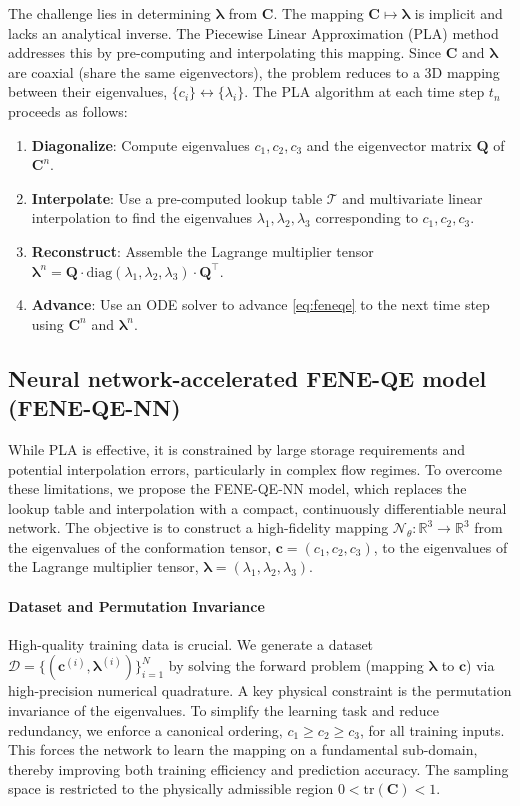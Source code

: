 \documentclass[preprint,12pt]{elsarticle}
\begin{document}
The challenge lies in determining $\bm{\lambda}$ from $\bm{C}$. The mapping $\bm{C} \mapsto \bm{\lambda}$ is implicit and lacks an analytical inverse. The Piecewise Linear Approximation (PLA) method \cite{Wang08} addresses this by pre-computing and interpolating this mapping. Since $\bm{C}$ and $\bm{\lambda}$ are coaxial (share the same eigenvectors), the problem reduces to a 3D mapping between their eigenvalues, $\{c_i\} \leftrightarrow \{\lambda_i\}$.
The PLA algorithm at each time step $t_n$ proceeds as follows:
\begin{enumerate}
    \item \textbf{Diagonalize}: Compute eigenvalues $c_1, c_2, c_3$ and the eigenvector matrix $\bm{Q}$ of $\bm{C}^n$.
    \item \textbf{Interpolate}: Use a pre-computed lookup table $\mathcal{T}$ and multivariate linear interpolation to find the eigenvalues $\lambda_1, \lambda_2, \lambda_3$ corresponding to $c_1, c_2, c_3$.
    \item \textbf{Reconstruct}: Assemble the Lagrange multiplier tensor $\bm{\lambda}^n = \bm{Q} \cdot \mathrm{diag}(\lambda_1, \lambda_2, \lambda_3) \cdot \bm{Q}^\top$.
    \item \textbf{Advance}: Use an ODE solver to advance \eqref{eq:feneqe} to the next time step using $\bm{C}^n$ and $\bm{\lambda}^n$.
\end{enumerate}

\subsection{Neural network-accelerated FENE-QE model (FENE-QE-NN)}
While PLA is effective, it is constrained by large storage requirements and potential interpolation errors, particularly in complex flow regimes. To overcome these limitations, we propose the FENE-QE-NN model, which replaces the lookup table and interpolation with a compact, continuously differentiable neural network. The objective is to construct a high-fidelity mapping $\mathcal{N}_{\theta}: \mathbb{R}^3 \to \mathbb{R}^3$ from the eigenvalues of the conformation tensor, $\bm{c}=(c_1, c_2, c_3)$, to the eigenvalues of the Lagrange multiplier tensor, $\bm{\lambda}=(\lambda_1, \lambda_2, \lambda_3)$.

\paragraph{Dataset and Permutation Invariance}
High-quality training data is crucial. We generate a dataset $\mathcal{D} = \{(\bm{c}^{(i)}, \bm{\lambda}^{(i)})\}_{i=1}^N$ by solving the forward problem (mapping $\bm{\lambda}$ to $\bm{c}$) via high-precision numerical quadrature. A key physical constraint is the permutation invariance of the eigenvalues. To simplify the learning task and reduce redundancy, we enforce a canonical ordering, $c_1 \ge c_2 \ge c_3$, for all training inputs. This forces the network to learn the mapping on a fundamental sub-domain, thereby improving both training efficiency and prediction accuracy. The sampling space is restricted to the physically admissible region $0 < \mathrm{tr}(\bm{C}) < 1$.
\end{document}
